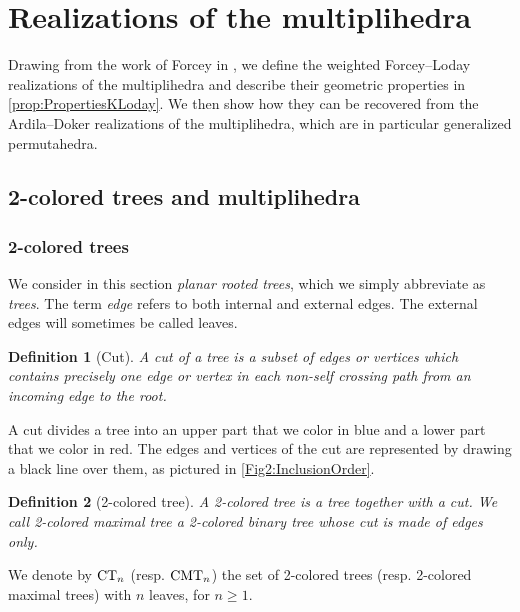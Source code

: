 \documentclass[twoside, 11pt]{amsart}
\newtheorem{definition}{Definition}[section]
\theoremstyle{remark}
\begin{document}

\section{Realizations of the multiplihedra} 
\label{sec:I}

Drawing from the work of Forcey in \cite{Forcey08}, we define the weighted Forcey--Loday realizations of the multiplihedra and describe their geometric properties in \cref{prop:PropertiesKLoday}.
We then show how they can be recovered from the Ardila--Doker realizations of the multiplihedra, which are in particular generalized permutahedra.


\subsection{2-colored trees and multiplihedra}

\subsubsection{2-colored trees}

We consider in this section \textit{planar rooted trees}, which we simply abbreviate as \textit{trees}. The term \emph{edge} refers to both internal and external edges. The external edges will sometimes be called leaves. 

\begin{definition}[Cut]
A \emph{cut} of a tree is a subset of edges or vertices which contains precisely one edge or vertex in each non-self crossing path from an incoming edge to the root.
\end{definition}

A cut divides a tree into an upper part that we color in blue and a lower part that we color in red. 
The edges and vertices of the cut are represented by drawing a black line over them, as pictured in \cref{Fig2:InclusionOrder}. 

\begin{definition}[2-colored tree] \label{def:2coloredtree}
A \emph{2-colored tree} is a tree together with a cut. We call \emph{2-colored maximal tree} a 2-colored binary tree whose cut is made of edges only. 
\end{definition}
We denote by $\mathrm{CT}_{n}$ (resp. $\mathrm{CMT}_{n}$) the set of 2-colored trees (resp. 2-colored maximal trees) with $n$ leaves, for $n\geq 1$. 
\end{document}
